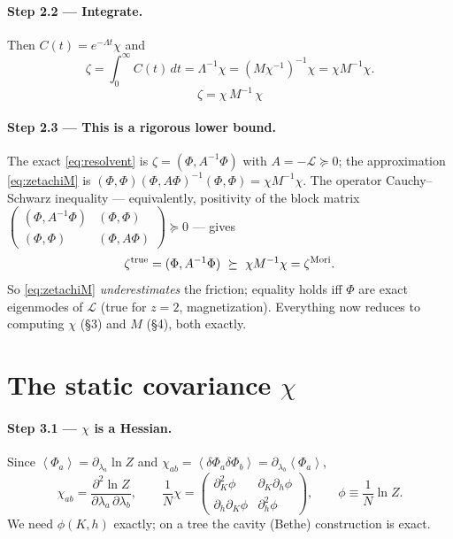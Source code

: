 \documentclass[11pt]{article}
\newcommand{\LL}{\mathcal{L}}
\newcommand{\avg}[1]{\left\langle #1 \right\rangle}
\newcommand{\dPhi}{\delta\Phi}
\begin{document}
\paragraph{Step 2.2 --- Integrate.}
Then $C(t)=e^{-\Lambda t}\chi$ and
\begin{equation}
\zeta=\int_0^\infty C(t)\,dt=\Lambda^{-1}\chi=(M\chi^{-1})^{-1}\chi=\chi M^{-1}\chi.
\end{equation}
\begin{equation}
\boxed{\;\zeta=\chi\,M^{-1}\,\chi\;}
\tag{2}\label{eq:zetachiM}
\end{equation}

\paragraph{Step 2.3 --- This is a rigorous lower bound.}
The exact \eqref{eq:resolvent} is $\zeta=(\Phi,A^{-1}\Phi)$ with $A=-\LL\succeq0$; the approximation
\eqref{eq:zetachiM} is $(\Phi,\Phi)(\Phi,A\Phi)^{-1}(\Phi,\Phi)=\chi M^{-1}\chi$. The operator
Cauchy--Schwarz inequality --- equivalently, positivity of the block matrix
$\left(\begin{smallmatrix}(\Phi,A^{-1}\Phi)&(\Phi,\Phi)\\(\Phi,\Phi)&(\Phi,A\Phi)\end{smallmatrix}\right)\succeq0$
--- gives
\begin{equation}
\zeta^{\rm true}=(\Phi,A^{-1}\Phi)\ \succeq\ \chi M^{-1}\chi=\zeta^{\rm Mori}.
\end{equation}
So \eqref{eq:zetachiM} \emph{underestimates} the friction; equality holds iff $\Phi$ are exact
eigenmodes of $\LL$ (true for $z=2$, magnetization). Everything now reduces to computing $\chi$
(\S3) and $M$ (\S4), both exactly.

\section{The static covariance \texorpdfstring{$\chi$}{chi}}

\paragraph{Step 3.1 --- $\chi$ is a Hessian.}
Since $\avg{\Phi_a}=\partial_{\lambda_a}\ln Z$ and
$\chi_{ab}=\avg{\dPhi_a\dPhi_b}=\partial_{\lambda_b}\avg{\Phi_a}$,
\begin{equation}
\chi_{ab}=\frac{\partial^2\ln Z}{\partial\lambda_a\,\partial\lambda_b},
\qquad
\frac1N\chi=\begin{pmatrix}\partial_K^2\phi&\partial_K\partial_h\phi\\[2pt]\partial_h\partial_K\phi&\partial_h^2\phi\end{pmatrix},
\qquad \phi\equiv\frac1N\ln Z .
\tag{3}\label{eq:hess}
\end{equation}
We need $\phi(K,h)$ exactly; on a tree the cavity (Bethe) construction is exact.
\end{document}
